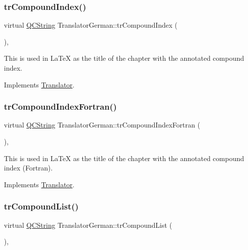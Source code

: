 \subsubsection{\texorpdfstring{trCompoundIndex()}{trCompoundIndex()}}
{\footnotesize\ttfamily virtual \mbox{\hyperlink{class_q_c_string}{Q\+C\+String}} Translator\+German\+::tr\+Compound\+Index (\begin{DoxyParamCaption}{ }\end{DoxyParamCaption})\hspace{0.3cm}{\ttfamily [inline]}, {\ttfamily [virtual]}}

This is used in La\+TeX as the title of the chapter with the annotated compound index. 

Implements \mbox{\hyperlink{class_translator}{Translator}}.

\mbox{\label{class_translator_german_a711bcd58cf49889f11985347707f9e54}} 
\subsubsection{\texorpdfstring{trCompoundIndexFortran()}{trCompoundIndexFortran()}}
{\footnotesize\ttfamily virtual \mbox{\hyperlink{class_q_c_string}{Q\+C\+String}} Translator\+German\+::tr\+Compound\+Index\+Fortran (\begin{DoxyParamCaption}{ }\end{DoxyParamCaption})\hspace{0.3cm}{\ttfamily [inline]}, {\ttfamily [virtual]}}

This is used in La\+TeX as the title of the chapter with the annotated compound index (Fortran). 

Implements \mbox{\hyperlink{class_translator}{Translator}}.

\mbox{\label{class_translator_german_acac4a1e50352a59a0dba5793cb6b97a3}} 
\subsubsection{\texorpdfstring{trCompoundList()}{trCompoundList()}}
{\footnotesize\ttfamily virtual \mbox{\hyperlink{class_q_c_string}{Q\+C\+String}} Translator\+German\+::tr\+Compound\+List (\begin{DoxyParamCaption}{ }\end{DoxyParamCaption})\hspace{0.3cm}{\ttfamily [inline]}, {\ttfamily [virtual]}}

